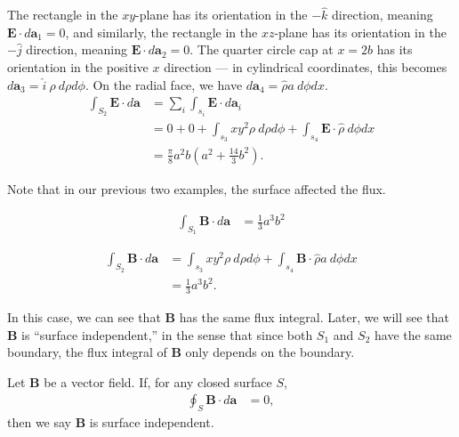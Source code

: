 \documentclass[10pt]{mypackage}
\begin{document}
\begin{example}
\begin{example}
    The rectangle in the $xy$-plane has its orientation in the $-\widehat{k}$ direction, meaning $\mathbf{E}\cdot d\mathbf{a}_1 = 0$, and similarly, the rectangle in the $xz$-plane has its orientation in the $-\widehat{j}$ direction, meaning $\mathbf{E}\cdot d\mathbf{a}_2 = 0$. The quarter circle cap at $x=2b$ has its orientation in the positive $x$ direction --- in cylindrical coordinates, this becomes $d\mathbf{a}_3 = \widehat{i}\:\rho\:d\rho d\phi$. On the radial face, we have $d\mathbf{a}_4 = \widehat{\rho} a\:d\phi dx$.
    \begin{align*}
      \int_{S_2}^{} \mathbf{E}\cdot d\mathbf{a} &= \sum_{i}\int_{s_i}^{} \mathbf{E}\cdot d\mathbf{a}_i\\
                                                &= 0 + 0 + \int_{s_3}^{} xy^2\rho\:d\rho d\phi + \int_{s_4}^{} \mathbf{E}\cdot \widehat{\rho}\:d\phi dx\\
                                                &= \frac{\pi}{8}a^2 b\left(a^2 + \frac{14}{3}b^2\right).
    \end{align*}
  \end{example}
  Note that in our previous two examples, the surface affected the flux.
  \begin{example}
    \begin{align*}
      \int_{S_1}^{} \mathbf{B}\cdot d\mathbf{a} &= \frac{1}{3}a^3b^2
    \end{align*}
  \end{example}
  \begin{example}
    \begin{align*}
      \int_{S_2}^{} \mathbf{B}\cdot d\mathbf{a} &= \int_{s_3}^{} xy^2\rho\:d\rho d\phi + \int_{s_4}^{} \mathbf{B}\cdot \widehat{\rho} a\:d\phi dx\\
                                                &= \frac{1}{3}a^3b^2.
    \end{align*}
  \end{example}
  In this case, we can see that $\mathbf{B}$ has the same flux integral. Later, we will see that $\mathbf{B}$ is ``surface independent,'' in the sense that since both $S_1$ and $S_2$ have the same boundary, the flux integral of $\mathbf{B}$ only depends on the boundary.
\end{example}
\begin{definition}
  Let $\mathbf{B}$ be a vector field. If, for any closed surface $S$,
  \begin{align*}
    \oint_{S}\mathbf{B}\cdot d\mathbf{a} &= 0,
  \end{align*}
  then we say $\mathbf{B}$ is surface independent.
\end{definition}
\end{document}
